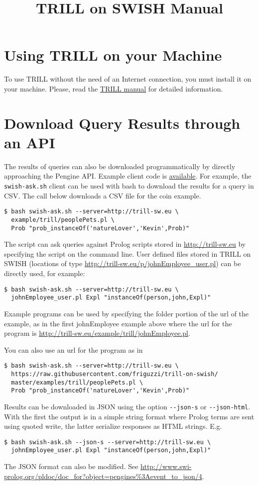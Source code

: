 \documentclass[a4paper,10pt]{scrartcl}
\begin{document}
\title{TRILL on SWISH Manual}
\maketitle





\section{Using TRILL on your Machine}
To use TRILL without the need of an Internet connection, you must install it on your machine. Please, read the \href{https://github.com/rzese/trill/blob/master/doc/manual.pdf}{TRILL manual} for detailed information.

\section{Download Query Results through an API}
The results of queries can also be downloaded programmatically by directly
approaching the Pengine API. Example client code is 
\href{https://github.com/friguzzi/trill-on-swish/tree/master/client}{available}.  For example, the \verb|swish-ask.sh| client
can be used with bash to download the results for a query in CSV.  The call
below downloads a CSV file for the coin example.
\begin{verbatim}
$ bash swish-ask.sh --server=http://trill-sw.eu \
  example/trill/peoplePets.pl \
  Prob "prob_instanceOf('natureLover','Kevin',Prob)"
\end{verbatim}
The script can ask queries against Prolog scripts stored in 
\url{http://trill-sw.eu} by specifying
the script on the command line.  User defined files stored
in TRILL on SWISH (locations of type
\url{http://trill-sw.eu/p/johnEmployee_user.pl}) can
be directly used, for example:
\begin{verbatim}
$ bash swish-ask.sh --server=http://trill-sw.eu \
  johnEmployee_user.pl Expl "instanceOf(person,john,Expl)"
\end{verbatim}
Example programs can be used by specifying the folder portion of the url of the example,
as in the first johnEmployee example above where the url for the program is 
\url{http://trill-sw.eu/example/trill/johnEmployee.pl}.

You can also use an url for the program as in 
\begin{verbatim}
$ bash swish-ask.sh --server=http://trill-sw.eu \
  https://raw.githubusercontent.com/friguzzi/trill-on-swish/
  master/examples/trill/peoplePets.pl \
  Prob "prob_instanceOf('natureLover','Kevin',Prob)"
\end{verbatim}
Results can be downloaded in JSON using the option \verb|--json-s| or
\verb|--json-html|.
With the first the output is in a simple string format where Prolog terms are sent using quoted write, the latter serialize responses as HTML strings. E.g.
\begin{verbatim}
$ bash swish-ask.sh --json-s --server=http://trill-sw.eu \
  johnEmployee_user.pl Expl "instanceOf(person,john,Expl)"
\end{verbatim}
The JSON format can also be modified. See
\url{http://www.swi-prolog.org/pldoc/doc_for?object=pengines%3Aevent_to_json/4}.
\end{document}

